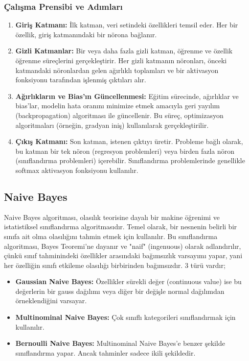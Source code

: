 \subsubsection{Çalışma Prensibi ve Adımları}
\begin{enumerate}
\item \textbf{Giriş Katmanı:} İlk katman, veri setindeki özellikleri temsil eder. Her bir özellik, giriş katmanındaki bir nörona bağlanır.
\item \textbf{Gizli Katmanlar:} Bir veya daha fazla gizli katman, öğrenme ve özellik öğrenme süreçlerini gerçekleştirir. Her gizli katmanın nöronları, önceki katmandaki nöronlardan gelen ağırlıklı toplamları ve bir aktivasyon fonksiyonu tarafından işlenmiş çıktıları alır.
\item \textbf{Ağırlıkların ve Bias'ın Güncellenmesi:} Eğitim sürecinde, ağırlıklar ve bias'lar, modelin hata oranını minimize etmek amacıyla geri yayılım (backpropagation) algoritması ile güncellenir. Bu süreç, optimizasyon algoritmaları (örneğin, gradyan iniş) kullanılarak gerçekleştirilir.
\item \textbf{Çıkış Katmanı:} Son katman, istenen çıktıyı üretir. Probleme bağlı olarak, bu katman bir tek nöron (regresyon problemleri) veya birden fazla nöron (sınıflandırma problemleri) içerebilir. Sınıflandırma problemlerinde genellikle softmax aktivasyon fonksiyonu kullanılır.
\end{enumerate}

\subsection{Naive Bayes}
Naive Bayes algoritması, olasılık teorisine dayalı bir makine öğrenimi ve istatistiksel sınıflandırma algoritmasıdır. Temel olarak, bir nesnenin belirli bir sınıfa ait olma olasılığını tahmin etmek için kullanılır. Bu sınıflandırma algoritması, Bayes Teoremi'ne dayanır ve "naif" (ingenuous) olarak adlandırılır, çünkü sınıf tahminindeki özellikler arasındaki bağımsızlık varsayımı yapar, yani her özelliğin sınıfı etkileme olasılığı birbirinden bağımsızdır. 3 türü vardır;
\begin{itemize}
\item \textbf{Gaussian Naive Bayes:} Özellikler sürekli değer (continuous value) ise bu değerlerin bir gauss dağılımı veya diğer bir değişle normal dağılımdan örneklendiğini varsayar.
\item \textbf{Multinominal Naive Bayes:} Çok sınıflı kategorileri sınıflandırmak için kullanılır.
\item \textbf{Bernoulli Naive Bayes:} Multinominal Naive Bayes’e benzer şekilde sınıflandırma yapar. Ancak tahminler sadece ikili şekildedir.
\end{itemize}

